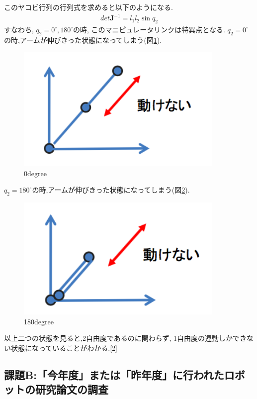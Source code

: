 \documentclass[a4paper,11pt,titlepage]{jsarticle}
\begin{document}
{このヤコビ行列の行列式を求めると以下のようになる.
\begin{align}
  det\bm{J}^{-1} = l_1l_2\sin{q_2}
\end{align}
すなわち, $q_2 = 0^{\circ}, 180^{\circ}$の時, このマニピュレータリンクは特異点となる.
$q_2=0^{\circ}$の時,アームが伸びきった状態になってしまう(図\ref{0degree}).
\begin{figure}[H]
  \begin{center}
    \includegraphics[width = 10cm]{画像/0degree.png}
    \caption{0degree}
    \label{0degree}
  \end{center}
\end{figure}


$q_2=180^{\circ}$の時,アームが伸びきった状態になってしまう(図\ref{180degree}).
\begin{figure}[H]
  \begin{center}
    \includegraphics[width = 10cm]{画像/180degree.png}
    \caption{180degree}
    \label{180degree}
  \end{center}
\end{figure}

以上二つの状態を見ると,2自由度であるのに関わらず, 1自由度の運動しかできない状態になっていることがわかる.[2]

\subsection{課題B:「今年度」または「昨年度」に行われたロボットの研究論文の調査}

}
\end{document}
